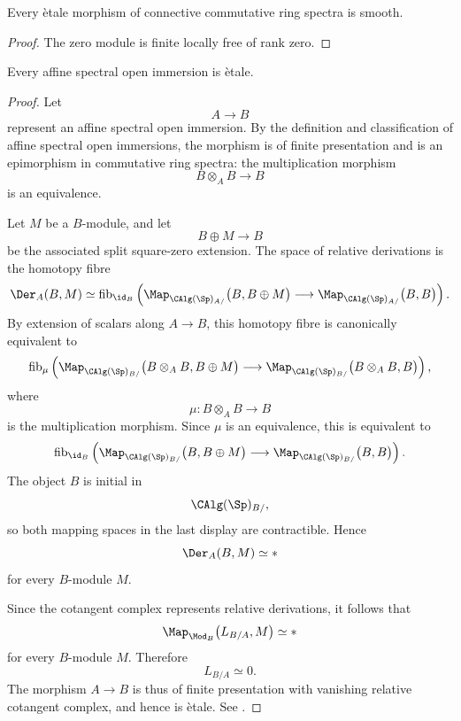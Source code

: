 \begin{corollary}
\label{cor:etale-implies-smooth}
Every \`etale morphism of connective commutative ring spectra is smooth.
\end{corollary}

\begin{proof}
The zero module is finite locally free of rank zero.
\end{proof}

\begin{proposition}
\label{prop:open-immersions-etale}
Every affine spectral open immersion is \`etale.
\end{proposition}

\begin{proof}
Let
\[
    A
    \longrightarrow
    B
\]
represent an affine spectral open immersion. By the definition and
classification of affine spectral open immersions, the morphism is of
finite presentation and is an epimorphism in commutative ring spectra:
the multiplication morphism
\[
    B\otimes_A B
    \longrightarrow
    B
\]
is an equivalence.

Let \(M\) be a \(B\)-module, and let
\[
    B\oplus M
    \longrightarrow
    B
\]
be the associated split square-zero extension. The space of relative
derivations is the homotopy fibre
\[
    \Der_A(B,M)
    \simeq
    \operatorname{fib}_{\id_B}
    \left(
        \Map_{\CAlg(\Sp)_{A/}}
        \bigl(
            B,
            B\oplus M
        \bigr)
        \longrightarrow
        \Map_{\CAlg(\Sp)_{A/}}
        \bigl(
            B,
            B
        \bigr)
    \right).
\]
By extension of scalars along \(A\to B\), this homotopy fibre is
canonically equivalent to
\[
    \operatorname{fib}_{\mu}
    \left(
        \Map_{\CAlg(\Sp)_{B/}}
        \bigl(
            B\otimes_A B,
            B\oplus M
        \bigr)
        \longrightarrow
        \Map_{\CAlg(\Sp)_{B/}}
        \bigl(
            B\otimes_A B,
            B
        \bigr)
    \right),
\]
where
\[
    \mu
    \colon
    B\otimes_A B
    \longrightarrow
    B
\]
is the multiplication morphism. Since \(\mu\) is an equivalence, this
is equivalent to
\[
    \operatorname{fib}_{\id_B}
    \left(
        \Map_{\CAlg(\Sp)_{B/}}
        \bigl(
            B,
            B\oplus M
        \bigr)
        \longrightarrow
        \Map_{\CAlg(\Sp)_{B/}}
        \bigl(
            B,
            B
        \bigr)
    \right).
\]
The object \(B\) is initial in
\[
    \CAlg(\Sp)_{B/},
\]
so both mapping spaces in the last display are contractible. Hence
\[
    \Der_A(B,M)
    \simeq
    *
\]
for every \(B\)-module \(M\).

Since the cotangent complex represents relative derivations, it follows
that
\[
    \Map_{\Mod_B}
    \bigl(
        L_{B/A},
        M
    \bigr)
    \simeq
    *
\]
for every \(B\)-module \(M\). Therefore
\[
    L_{B/A}
    \simeq
    0.
\]
The morphism \(A\to B\) is thus of finite presentation with vanishing
relative cotangent complex, and hence is \`etale. See
\cite{LurieSAG}.
\end{proof}

